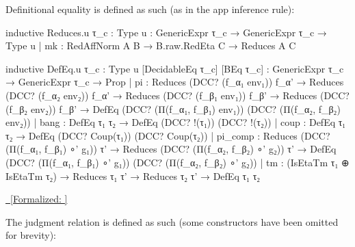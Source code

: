 \documentclass{article}
\newcommand{\lean}[1]{\EscVerb{#1}}
\newcommand{\leanlink}[2]{
  \hfill \href{#1}{\textcolor{leanblue}\faCheckSquare~[Formalized: \texttt{#2}]}%
}
\begin{document}
Definitional equality is defined as such (as in the app inference rule):

\begin{leancode}
inductive Reduces.{u} {τ_c : Type u} : GenericExpr τ_c → GenericExpr τ_c → Type u
  | mk : RedAffNorm A B
    → B.raw.RedEta C
    → Reduces A C

inductive DefEq.{u} {τ_c : Type u} [DecidableEq τ_c] [BEq τ_c] : GenericExpr τ_c → GenericExpr τ_c → Prop
  | pi      : Reduces (DCC? (f_α₁ env₁)) f_α'
    → Reduces (DCC? (f_α₂ env₂)) f_α'
    → Reduces (DCC? (f_β₁ env₁)) f_β'
    → Reduces (DCC? (f_β₂ env₂)) f_β'
    → DefEq (DCC? (Π(f_α₁, f_β₁) env₁)) (DCC? (Π(f_α₂, f_β₂) env₂))
  | bang    : DefEq τ₁ τ₂ → DefEq (DCC? !(τ₁)) (DCC? !(τ₂))
  | coup    : DefEq τ₁ τ₂ → DefEq (DCC? Coup(τ₁)) (DCC? Coup(τ₂))
  | pi_comp : Reduces (DCC? (Π(f_α₁, f_β₁) ∘' g₁)) τ'
    → Reduces (DCC? (Π(f_α₂, f_β₂) ∘' g₂)) τ'
    → DefEq (DCC? (Π(f_α₁, f_β₁) ∘' g₁)) (DCC? (Π(f_α₂, f_β₂) ∘' g₂))
  | tm : (IsEtaTm τ₁ ⊕ IsEtaTm τ₂)
    → Reduces τ₁ τ'
    → Reduces τ₂ τ'
    → DefEq τ₁ τ₂
\end{leancode}
\noindent \hfill\leanlink{https://github.com/lexzaiello/DCC/blob/891ac3750b8ed6d7ef7de14e01d4df5d8ed59129/Dcc/Judge3.lean\#L141}{\lean{Dcc.GenericExpr.DefEq}}

The judgment relation is defined as such (some constructors have been omitted for brevity):
\end{document}
